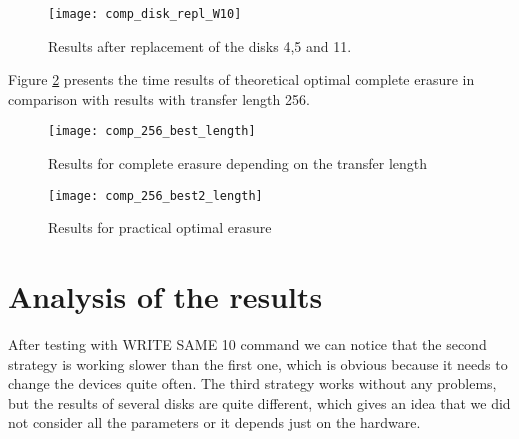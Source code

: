 \begin{figure}[h!]
\begin{center}
  \texttt{[image: comp\_disk\_repl\_W10]}
\end{center}
  \caption{Results after replacement of the disks 4,5 and 11.}
  \label{fig:comp_disk_repl_W10}
\end{figure}


\newpage
Figure \ref{fig:comp_256_best_length} presents the time results of theoretical optimal complete erasure in comparison with results with transfer length 256.
\begin{figure}[h!]
\begin{center}
  \texttt{[image: comp\_256\_best\_length]}
\end{center}
  \caption{Results for complete erasure depending on the transfer length}
  \label{fig:comp_256_best_length}
\end{figure}

\begin{figure}[h!]
\begin{center}
  \texttt{[image: comp\_256\_best2\_length]}
\end{center}
  \caption{Results for practical optimal erasure}
  \label{fig:comp_256_best2_length}
\end{figure}



\newpage
\section{Analysis of the results}

After testing with WRITE SAME 10 command we can notice that the second strategy is working slower than the first one, which is obvious because it needs to change the devices quite often. The third strategy works without any problems, but the results of several disks are quite different, which gives an idea that we did not consider all the parameters or it depends just on the hardware.

